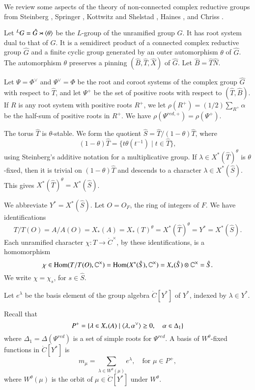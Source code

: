 We review some aspects of the theory of non-connected complex
reductive groups from Steinberg \cite{steinberg1968endomorphisms},
Springer \cite{springer2010linear}, Kottwitz and Shelstad
\cite{kottwitz1999foundations}, Haines \cite{haines2016dualities}, and
Chriss \cite{chriss}.

Let ${}^LG = \hat G \rtimes \langle{\theta}\rangle$ be the $L$-group of the
unramified group $G$.  It has root system dual to that of $G$.  It is
a semidirect product of a connected complex reductive group $\hat G$
and a finite cyclic group generated by an outer automorphism $\theta$
of $\hat G$.  The automorphism $\theta$ preserves a pinning $(\hat
B,\hat T,\hat X)$ of $\hat G$. Let $\hat B = \hat T\hat N$.

Let $\Psi=\Phi^\vee$ and $\Psi^\vee=\Phi$ be the root and coroot
systems of the complex group $\hat G$ with respect to $\hat T$, and
let $\Psi^+$ be the set of positive roots with respect to $(\hat
T,\hat B)$.  If $R$ is any root system with positive roots $R^+$, we
let $\rho(R^+) = (1/2)\sum_{R^+} \alpha$ be the half-sum of positive
roots in $R^+$.  We have $\rho(\Psi^{red,+}) = \rho(\Psi^+)$.

The torus $\hat T$ is $\theta$-stable.  We form the quotient $\hat S =
\hat T/(1-\theta) \hat T$, where
\[
(1-\theta)\hat T = \{ t\theta(t^{-1}) \mid t\in \hat T\},
\]
using Steinberg's additive notation for a multiplicative group.  If
$\lambda\in X^*(\hat T)^\theta$ is $\theta$-fixed, then it is trivial
on $(1-\theta)\hat T$ and descends to a character $\lambda\in X^*(\hat
S)$.  This gives $X^*(\hat T)^\theta = X^*(\hat S)$.

We abbreviate $Y^* = X^*(\hat S)$. Let $O=O_F$, the ring of integers
of $F$.  We have identifications
\begin{equation}\label{eqn:identify}
T/T(O)=A/A(O)=X_*(A)=X_*(T)^\theta  =X^*(\hat T)^\theta = Y^* = X^*(\hat S).
\end{equation}
Each unramified character $\chi:T\to \ring{C}^\times$, by these
identifications, is a homomorphism
\begin{equation}
\chi\in{\operatorname{Hom}}(T/T(O),\mathbb{C}^\times) = 
{\operatorname{Hom}}(X^*(\hat S),\mathbb{C}^\times) = 
X_*(\hat S)\otimes \mathbb{C}^\times = \hat S.
\end{equation}
We write $\chi = \chi_s$, for $s\in\hat S$.

Let $e^\lambda$ be the basis element of the group algebra
$\ring{C}[Y^*]$ of $Y^*$, indexed by $\lambda\in Y^*$.

Recall that
\[
P^+ = \{\lambda\in X_*(A) \mid \langle{\lambda,\alpha^\vee}\rangle\ge 0,
\quad \alpha\in \Delta_1\}
\]
where $\Delta_1=\Delta(\Psi^{red})$ is a set of simple roots for
$\Psi^{red}$.  A basis of $W^\theta$-fixed functions in
$\ring{C}[Y^*]$ is
\begin{equation}\label{eqn:mmu}
m_\mu = \sum_{\lambda\in W^\theta(\mu)} e^\lambda, 
\quad \text{for }\mu\in P^+,
\end{equation}
where $W^\theta(\mu)$ is the orbit of $\mu\in\ring{C}[Y^*]$ under
$W^\theta$.

